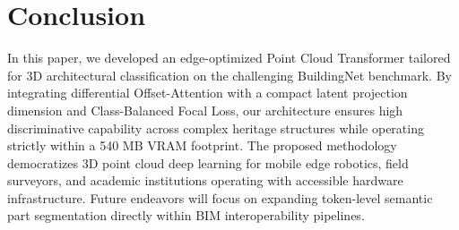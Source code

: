 \section{Conclusion}
\label{sec:conclusion}

In this paper, we developed an edge-optimized Point Cloud Transformer tailored for 3D architectural classification on the challenging BuildingNet benchmark. By integrating differential Offset-Attention with a compact latent projection dimension and Class-Balanced Focal Loss, our architecture ensures high discriminative capability across complex heritage structures while operating strictly within a 540 MB VRAM footprint. The proposed methodology democratizes 3D point cloud deep learning for mobile edge robotics, field surveyors, and academic institutions operating with accessible hardware infrastructure. Future endeavors will focus on expanding token-level semantic part segmentation directly within BIM interoperability pipelines.

